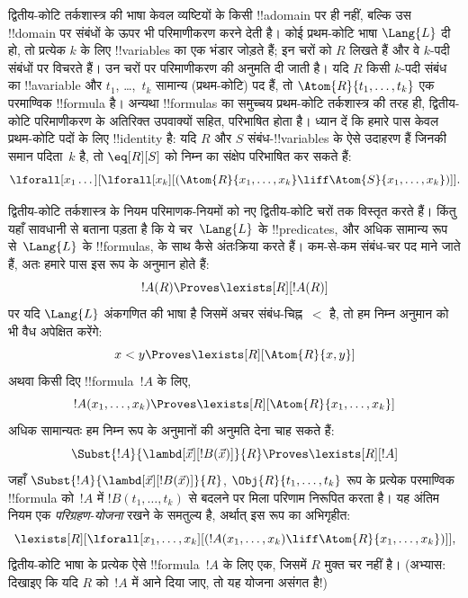 \documentclass[../../../include/open-logic-section]{subfiles}
\begin{document}


द्वितीय-कोटि तर्कशास्त्र की भाषा केवल व्यष्टियों के किसी !!a{domain} पर ही
नहीं, बल्कि उस !!{domain} पर संबंधों के ऊपर भी परिमाणीकरण करने देती है। कोई
प्रथम-कोटि भाषा $\Lang{L}$ दी हो, तो प्रत्येक $k$ के लिए !!{variable}s का एक
भंडार जोड़ते हैं; इन चरों को $R$ लिखते हैं और वे $k$-पदी संबंधों पर विचरते हैं। उन चरों पर परिमाणीकरण की अनुमति
दी जाती है। यदि $R$ किसी $k$-पदी संबंध का !!a{variable} और $t_1$,
\dots,~$t_k$ सामान्य (प्रथम-कोटि) पद हैं, तो $\Atom{R}{t_1,\dots,t_k}$ एक
परमाण्विक !!{formula} है। अन्यथा !!{formula}s का समुच्चय प्रथम-कोटि
तर्कशास्त्र की तरह ही, द्वितीय-कोटि परिमाणीकरण के अतिरिक्त उपवाक्यों सहित,
परिभाषित होता है। ध्यान दें कि हमारे पास केवल प्रथम-कोटि पदों के लिए
!!{identity} है: यदि $R$ और $S$ संबंध-!!{variable}s के ऐसे उदाहरण हैं जिनकी
समान पदिता~$k$ है, तो $\eq[R][S]$ को निम्न का संक्षेप परिभाषित कर सकते हैं:
\[
\lforall[x_1 \dots][\lforall[x_k][(\Atom{R}{x_1, \dots, x_k} \liff
  \Atom{S}{x_1, \dots, x_k})]].
\]

द्वितीय-कोटि तर्कशास्त्र के नियम परिमाणक-नियमों को नए द्वितीय-कोटि चरों तक
विस्तृत करते हैं। किंतु यहाँ सावधानी से बताना पड़ता है कि ये चर~$\Lang{L}$
के !!{predicate}s, और अधिक सामान्य रूप से~$\Lang{L}$ के !!{formula}s, के
साथ कैसे अंतःक्रिया करते हैं। कम-से-कम संबंध-चर पद माने जाते हैं, अतः हमारे
पास इस रूप के अनुमान होते हैं:
\[
!A(R) \Proves \lexists[R][!A(R)]
\]
पर यदि $\Lang{L}$ अंकगणित की भाषा है जिसमें अचर संबंध-चिह्न~$<$ है, तो हम
निम्न अनुमान को भी वैध अपेक्षित करेंगे:
\[
x < y \Proves \lexists[R][\Atom{R}{x,y}]
\]
अथवा किसी दिए !!{formula}~$!A$ के लिए,
\[
!A(x_1, \dots, x_k) \Proves \lexists[R][\Atom{R}{x_1,\dots,x_k}]
\]
अधिक सामान्यतः हम निम्न रूप के अनुमानों की अनुमति देना चाह सकते हैं:
\[
\Subst{!A}{\lambd[\vec x][!B(\vec x)]}{R} \Proves
\lexists[R][!A]
\]
जहाँ $\Subst{!A}{\lambd[\vec x][!B(\vec x)]}{R}$,
$\Obj{R}{t_1,\dots,t_k}$ रूप के प्रत्येक परमाण्विक !!{formula} को~$!A$ में
$!B(t_1, \dots, t_k)$ से बदलने पर मिला परिणाम निरूपित करता है। यह अंतिम
नियम एक {\em परिग्रहण-योजना} रखने के समतुल्य है, अर्थात् इस रूप का अभिगृहीत:
\[
\lexists[R][\lforall[x_1, \dots, x_k][(!A(x_1, \dots, x_k) \liff
\Atom{R}{x_1, \dots, x_k})]],
\]
द्वितीय-कोटि भाषा के प्रत्येक ऐसे !!{formula}~$!A$ के लिए एक, जिसमें $R$
मुक्त चर नहीं है। (अभ्यास: दिखाइए कि यदि $R$ को~$!A$ में आने दिया जाए, तो
यह योजना असंगत है!)
\end{document}
